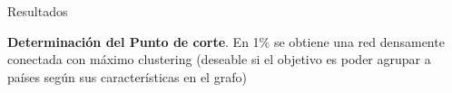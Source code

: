 \documentclass[compress]{beamer}
\begin{document}
\begin{frame}
\centering
\Large Resultados
\end{frame}

\begin{frame}

\scriptsize{
\textbf{Determinación del Punto de corte}. En 1\% se obtiene una red densamente conectada con máximo clustering (deseable si el objetivo es poder agrupar a países según sus características en el grafo)}

	\begin{figure}
		\centering

\end{figure}
\end{frame}
\end{document}
